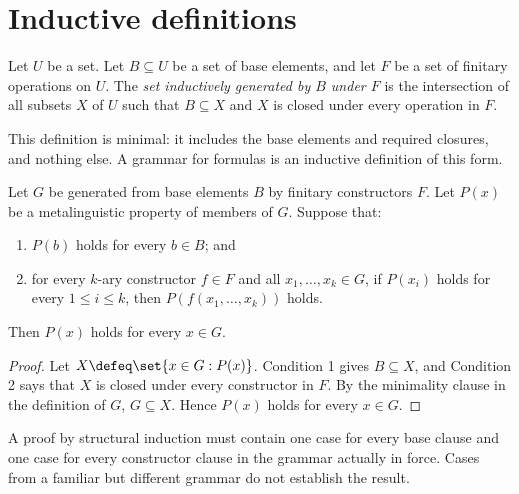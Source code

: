 \section{Inductive definitions}
\label{sec:strings-02}

\begin{definition}
Let \(U\) be a set.  Let \(B\subseteq U\) be a set of base elements, and let
\(F\) be a set of finitary operations on \(U\).  The \emph{set inductively
generated by \(B\) under \(F\)} is the intersection of all subsets \(X\) of
\(U\) such that \(B\subseteq X\) and \(X\) is closed under every operation in
\(F\).
\end{definition}

This definition is minimal: it includes the base elements and required
closures, and nothing else.  A grammar for formulas is an inductive definition
of this form.

\begin{theorem}
Let \(G\) be generated from base elements \(B\) by finitary constructors
\(F\).  Let \(P(x)\) be a metalinguistic property of members of \(G\).  Suppose
that:
\begin{enumerate}
  \item \(P(b)\) holds for every \(b\in B\); and
  \item for every \(k\)-ary constructor \(f\in F\) and all
        \(x_1,\ldots,x_k\in G\), if \(P(x_i)\) holds for every
        \(1\leq i\leq k\), then \(P(f(x_1,\ldots,x_k))\) holds.
\end{enumerate}
Then \(P(x)\) holds for every \(x\in G\).
\end{theorem}
\begin{proof}
Let \(X\defeq\set{x\in G:P(x)}\).  Condition 1 gives \(B\subseteq X\), and
Condition 2 says that \(X\) is closed under every constructor in \(F\).  By the
minimality clause in the definition of \(G\), \(G\subseteq X\).  Hence
\(P(x)\) holds for every \(x\in G\).
\end{proof}

\begin{warning}
A proof by structural induction must contain one case for every base clause and
one case for every constructor clause in the grammar actually in force.  Cases
from a familiar but different grammar do not establish the result.
\end{warning}

